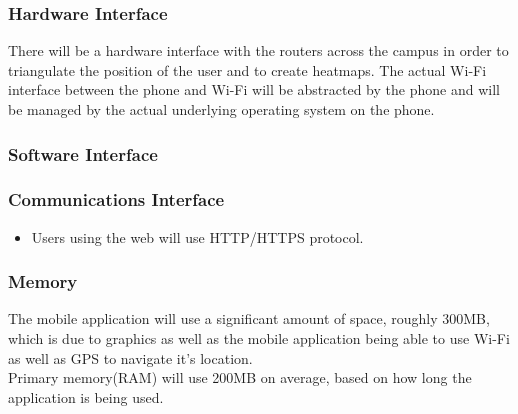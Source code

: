 \documentclass{article}
\begin{document}
            \subsubsection{Hardware Interface}
		{There will be a hardware interface with the routers across the campus in order to triangulate the position of the user and to create heatmaps. The actual Wi-Fi interface between the phone and Wi-Fi will be abstracted by the phone and will be managed by the actual underlying operating system on the phone.}
            \subsubsection{Software Interface}
            
            \subsubsection{Communications Interface} \begin{itemize}
	    \item Users using the web will use HTTP/HTTPS protocol.
	    \end{itemize}
            \subsubsection{Memory}
	    {The mobile application will use a significant amount of space, roughly 300MB, which is due to graphics as well as the mobile application being able to use Wi-Fi as well as GPS to navigate it's location.\\
Primary memory(RAM) will use 200MB on average, based on how long the application is being used.}
\end{document}
